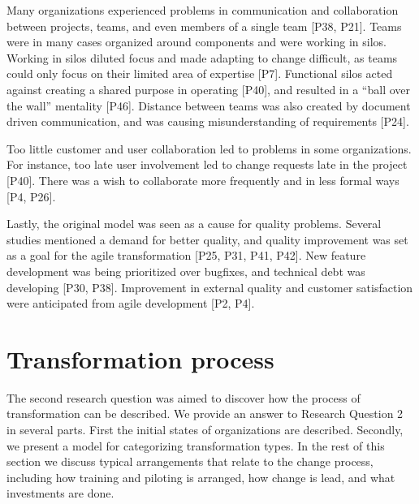 Many organizations experienced problems in communication and collaboration
between projects, teams, and even members of a single team [P38, P21].
Teams were in many cases organized around components and were working in silos.
Working in silos diluted focus and made adapting to change difficult, as teams
could only focus on their limited area of expertise [P7]. Functional silos acted
against creating a shared purpose in operating [P40], and resulted in a ``ball
over the wall'' mentality [P46]. Distance between teams was also created by
document driven communication, and was causing misunderstanding of requirements
[P24].

Too little customer and user collaboration led to problems in some
organizations. For instance, too late user involvement led to change requests
late in the project [P40]. There was a wish to collaborate more frequently and
in less formal ways [P4, P26].


% 

Lastly, the original model was seen as a cause for quality problems.
Several studies mentioned a demand for better quality, and quality improvement
was set as a goal for the agile transformation [P25, P31, P41, P42]. New feature
development was being prioritized over bugfixes, and technical debt was
developing [P30, P38]. Improvement in external quality and customer satisfaction
were anticipated from agile development [P2, P4].


\clearpage

\section{Transformation process}

The second research question was aimed to discover how the process of
transformation can be described.
We provide an answer to Research Question 2 in several parts. First the initial
states of organizations are described. Secondly, we present a model for
categorizing transformation types. In the rest of this section we discuss
typical arrangements that relate to the change process, including how training
and piloting is arranged, how change is lead, and what investments are done.

